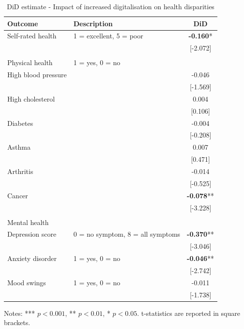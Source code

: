 \begin{table}[h!]
    \centering
    \caption{DiD estimate - Impact of increased digitalisation on health disparities}
    \label{tab:did}
    \begin{threeparttable}
        \begin{tabular}{llc}
            \toprule
            Outcome & Description & DiD \\
            \midrule
            Self-rated health & 1 = excellent, 5 = poor & \textbf{-0.160}* \\
            &  & [-2.072] \\
            & & \\
            Physical health & 1 = yes, 0 = no & \\
            High blood pressure &  & -0.046 \\
            &  & [-1.569] \\
            High cholesterol &  & 0.004 \\
            &  & [0.106] \\
            Diabetes &  & -0.004 \\
            &  & [-0.208] \\
            Asthma &  & 0.007 \\
            &  & [0.471] \\
            Arthritis &  & -0.014 \\
            &  & [-0.525] \\
            Cancer &  & \textbf{-0.078}** \\
            &  & [-3.228] \\
            & & \\
            Mental health & & \\
            Depression score & 0 = no symptom, 8 = all symptoms & \textbf{-0.370}** \\
            &  & [-3.046] \\
            Anxiety disorder & 1 = yes, 0 = no & \textbf{-0.046}** \\
            &  & [-2.742] \\
            Mood swings & 1 = yes, 0 = no & -0.011 \\
            &  & [-1.738] \\
            \bottomrule
        \end{tabular}
        \begin{tablenotes}
            \footnotesize
            \item Notes: *** $p < 0.001$, ** $p < 0.01$, * $p < 0.05$. t-statistics are reported in square brackets.
        \end{tablenotes}
    \end{threeparttable}
\end{table}

